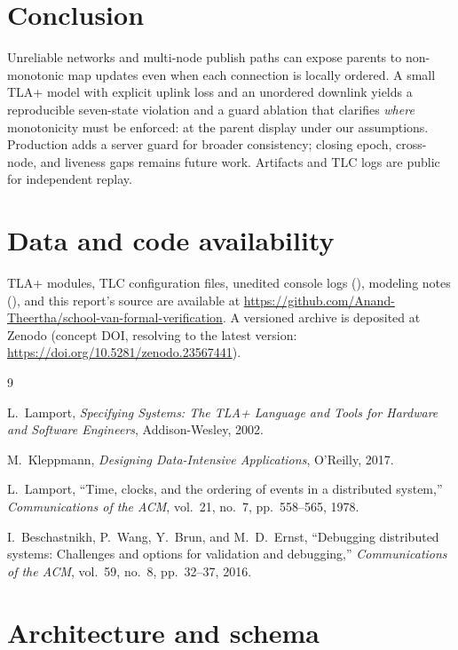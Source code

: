 \documentclass[11pt,a4paper]{article}
\begin{document}
\section{Conclusion}
\label{sec:conclusion}

Unreliable networks and multi-node publish paths can expose parents to non-monotonic map updates even when each connection is locally ordered. A small TLA+ model with explicit uplink loss and an unordered downlink yields a reproducible seven-state violation and a guard ablation that clarifies \emph{where} monotonicity must be enforced: at the parent display under our assumptions. Production adds a server guard for broader consistency; closing epoch, cross-node, and liveness gaps remains future work. Artifacts and TLC logs are public for independent replay.

\section*{Data and code availability}

TLA+ modules, TLC configuration files, unedited console logs (), modeling notes (), and this report's source are available at \url{https://github.com/Anand-Theertha/school-van-formal-verification}. A versioned archive is deposited at Zenodo (concept DOI, resolving to the latest version: \url{https://doi.org/10.5281/zenodo.23567441}).

\begin{thebibliography}{9}

L.~Lamport,
\emph{Specifying Systems: The TLA+ Language and Tools for Hardware and Software Engineers},
Addison-Wesley, 2002.

M.~Kleppmann,
\emph{Designing Data-Intensive Applications},
O'Reilly, 2017.

L.~Lamport,
``Time, clocks, and the ordering of events in a distributed system,''
\emph{Communications of the ACM}, vol.~21, no.~7, pp.~558--565, 1978.

I.~Beschastnikh, P.~Wang, Y.~Brun, and M.~D.~Ernst,
``Debugging distributed systems: Challenges and options for validation and debugging,''
\emph{Communications of the ACM}, vol.~59, no.~8, pp.~32--37, 2016.

\end{thebibliography}

\appendix

\section{Architecture and schema}
\label{app:arch}
\end{document}
